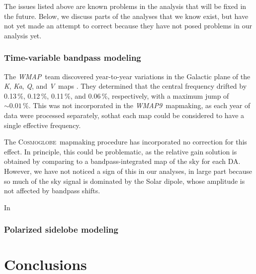 \documentclass[twocolumn]{../../common/aa}
\def\WMAP{\emph{WMAP}}
\def\WMAPnine{\emph{WMAP9}}
\newcommand{\cosmoglobe}{\textsc{Cosmoglobe}}
\newcommand{\K}[0]{\textit K}
\newcommand{\Ka}[0]{\textit{Ka}}
\newcommand{\Q}[0]{\textit Q}
\newcommand{\V}[0]{\textit V}
\begin{document}
The issues listed above are known problems in the analysis that will be fixed in the future. Below, we discuss parts of the analyses that we know exist, but have not yet made an attempt to correct because they have not posed problems in our analysis yet.

\subsubsection{Time-variable bandpass modeling}

The \WMAP\ team discovered year-to-year variations in the Galactic plane of the \K, \Ka, \Q, and \V\ maps \citep[Appendix A]{bennett2012}. They determined that the central frequency drifted by 0.13\,\%, 0.12\,\%, 0.11\,\%, and 0.06\,\%, respectively, with a maximum jump of $\sim0.01\,\%$. This was not incorporated in the \WMAPnine\ mapmaking, as each year of data were processed separately, sothat each map could be considered to have a single effective frequency.

The \cosmoglobe\ mapmaking procedure has incorporated no correction for this effect. In principle, this could be problematic, as the relative gain solution is obtained by comparing to a bandpass-integrated map of the sky for each DA. However, we have not noticed a sign of this in our analyses, in large part because so much of the sky signal is dominated by the Solar dipole, whose amplitude is not affected by bandpass shifts.

In 

\subsubsection{Polarized sidelobe modeling}


\section{Conclusions}
\label{sec:conclusions}
\end{document}
